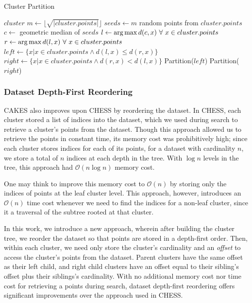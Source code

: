 \begin{algorithm} %
\caption{Cluster Partition} %
\label{alg:partition} %
\begin{algorithmic}[1] %
    \REQUIRE $cluster$
    \STATE $m \leftarrow \lfloor \sqrt{|cluster.points|} \rfloor$
    \STATE $seeds \leftarrow m$ random points from $cluster.points$
    \STATE $c \leftarrow$ geometric median of $seeds$
    \STATE $l \leftarrow \operatorname*{arg\,max} d(c,x) \ \forall \ x \in cluster.points$
    \STATE $r \leftarrow \operatorname*{arg\,max} d(l,x) \ \forall \ x \in cluster.points$
    \STATE $left \leftarrow \{x | x \in cluster.points \land d(l,x) \le d(r,x)\}$
    \STATE $right \leftarrow \{x | x \in cluster.points \land d(r,x) < d(l,x)\}$
        \STATE Partition($left$)
    \ENDIF
        \STATE Partition($right$)
    \ENDIF
\end{algorithmic}
\end{algorithm}

\subsubsection {Dataset Depth-First Reordering}

CAKES also improves upon CHESS by reordering the dataset. In CHESS, each cluster stored a list of indices into the dataset, 
which we used during search to retrieve a cluster's points from the dataset. 
Though this approach allowed us to retrieve the points in constant 
time, its memory cost was prohibitively high; since each cluster stores indices for each of its
points, for a dataset with cardinality $n$, we store a total of $n$ indices at each depth in the tree.
With $\log{}n$ levels in the tree, this approach had $\mathcal{O}(n\log{}n)$ memory cost. 


One may think to improve this memory cost to $\mathcal{O}(n)$ by storing only the indices of points at 
the leaf cluster level.
This approach, however, introduces an $\mathcal{O}(n)$ time cost whenever we need to find the indices for 
a non-leaf cluster, since it a traversal of the subtree rooted at that cluster.


In this work, we introduce a new approach, wherein after building the cluster tree, we reorder the dataset 
so that points are stored in a depth-first order. Then, within each cluster, we need only 
store the cluster's cardinality and an \emph{offset} to access the cluster's points from the dataset. Parent clusters 
have the same offset as their left child, and right child clusters have an offset equal to their sibling's offset
plus their siblings's cardinality. With no additional memory cost nor time cost for retrieving a points during search, 
dataset depth-first reordering offers significant improvements over the approach used in CHESS.


